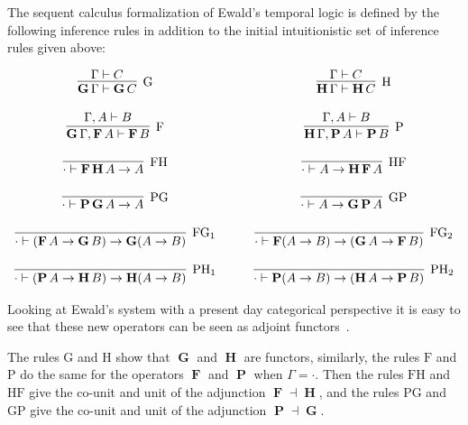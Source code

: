 \documentclass{article}
\newcommand{\F}{\mathop{\textbf{F}}}
\renewcommand{\P}{\mathop{\textbf{P}}}
\newcommand{\G}{\mathop{\textbf{G}}}
\renewcommand{\H}{\mathop{\textbf{H}}}
\begin{document}
The sequent calculus formalization of Ewald's
temporal logic is defined by the following inference rules in addition
to the initial intuitionistic set of inference rules given above:
\begin{center}
  \small
  \begin{math}
    \begin{array}{cccccc}
      \infer[\text{G}]{\G \Gamma \vdash \G C}{
        \Gamma \vdash C
      }
      & \quad &
      \infer[\text{H}]{\H\Gamma \vdash \H C}{
        \Gamma \vdash C
      }\\\\
      \infer[\text{F}]{\G\Gamma,\F A \vdash \F B}{
        \Gamma,A \vdash B
      }
      & \quad &
      \infer[\text{P}]{\H\Gamma,\P A \vdash \P B}{
        \Gamma,A \vdash B
      }\\\\
      \infer[\text{FH}]{\cdot \vdash \F\H A \to A}{
        \,
      }
      & \quad &
      \infer[\text{HF}]{\cdot \vdash A \to \H\F A}{
        \,
      }\\\\
      \infer[\text{PG}]{\cdot \vdash \P\G A \to A}{
        \,
      }
      & \quad &
      \infer[\text{GP}]{\cdot \vdash A \to \G\P A}{
        \,
      }\\\\
      \infer[\text{FG}_1]{\cdot \vdash (\F A \to \G B) \to \G(A \to B)}{
        \,
      }
      & \quad &
      \infer[\text{FG}_2]{\cdot \vdash \F(A \to B) \to (\G A \to \F B)}{
        \,
      }\\\\
      \infer[\text{PH}_1]{\cdot \vdash (\P A \to \H B) \to \H(A \to B)}{
        \,
      }
      & \quad &
      \infer[\text{PH}_2]{\cdot \vdash \P(A \to B) \to (\H A \to \P B)}{
        \,
      }      
    \end{array}
  \end{math}
\end{center}
Looking at Ewald's system  with a present day categorical perspective it is easy to see that these new operators can be seen as adjoint functors~\cite{Menni:2014}.  

The rules $\text{G}$ and $\text{H}$ show that $\G$
and $\H$ are functors, similarly, the rules $\text{F}$ and $\text{P}$
do the same for the operators $\F$ and $\P$ when $\Gamma = \cdot$.
Then the rules $\text{FH}$ and $\text{HF}$ give the co-unit and unit
of the adjunction $\F \dashv \H$, and the rules $\text{PG}$ and
$\text{GP}$ give the co-unit and unit of the adjunction $\P \dashv
\G$.
\end{document}
